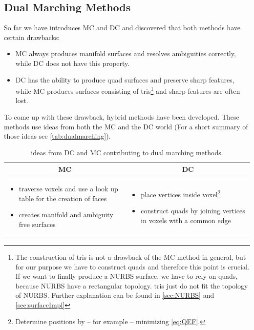 \subsection{Dual Marching Methods}
So far we have introduces \ac{MC} and \ac{DC} and discovered that both methods have certain drawbacks:
\begin{itemize}
\item \ac{MC} always produces manifold surfaces and resolves ambiguities correctly, while \ac{DC} does not have this property.
\item \ac{DC} has the ability to produce \ac{quad} surfaces and preserve sharp features, while \ac{MC} produces surfaces consisting of \acp{tri}\footnote{The construction of \acp{tri} is not a drawback of the \ac{MC} method in general, but for our purpose we have to construct \acp{quad} and therefore this point is crucial. If we want to finally produce a \ac{NURBS} surface, we have to rely on \acp{quad}, because \ac{NURBS} have a rectangular topology. \Acp{tri} just do not fit the topology of \ac{NURBS}. Further explanation can be found in \autoref{sec:NURBS} and \autoref{sec:surfaceImpl}} and sharp features are often lost.
\end{itemize}
To come up with these drawback, hybrid methods have been developed. These methods use ideas from both the \ac{MC} and the \ac{DC} world (For a short summary of those ideas see \autoref{tab:dualmarching}).
\begin{table}[H]
\begin{tabularx}{\textwidth}{X|X}
\multicolumn{1}{c|}{\acl{MC}} 
    & \multicolumn{1}{c}{\acl{DC}} 
\\
\hline
\begin{itemize}[noitemsep, topsep = 0pt, leftmargin=1em]
\item traverse voxels and use a look up table for the creation of faces
\item creates manifold and ambiguity free surfaces
\end{itemize}
&
\begin{itemize}[noitemsep, topsep = 0pt, leftmargin=1em]
\item place vertices inside voxel\footnote{Determine positions by -- for example -- minimizing \autoref{eq:QEF}.}
\item construct \acp{quad} by joining vertices in voxels with a common edge
\end{itemize}
\end{tabularx}
\caption{ideas from \ac{DC} and \ac{MC} contributing to dual marching methods.}
\label{tab:dualmarching}
\end{table}

